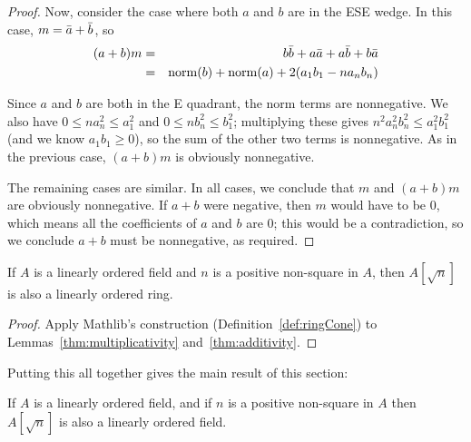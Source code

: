 \begin{proof}
  Now, consider the case where both $a$ and $b$ are in the ESE wedge. In this
  case, $m = \bar{a} + \bar{b}$, so
  \begin{eqnarray*}
    (a + b)m
      & = & b\bar{b} + a\bar{a} + a\bar{b} + b\bar{a} \\
      & = & \operatorname{norm}(b) + \operatorname{norm}(a) + 2(a_1b_1 - na_nb_n) \\
  \end{eqnarray*}

  Since $a$ and $b$ are both in the E quadrant, the norm terms are nonnegative.
  We also have $0 \leq na_n^2 \leq a_1^2$ and $0 \leq nb_n^2 \leq b_1^2$;
  multiplying these gives $n^2a_n^2b_n^2 \leq a_1^2b_1^2$ (and we know $a_1b_1
  \geq 0$), so the sum of the other two terms is nonnegative. As in the
  previous case, $(a + b)m$ is obviously nonnegative.

  The remaining cases are similar. In all cases, we conclude that $m$ and $(a +
  b)m$ are obviously nonnegative. If $a + b$ were negative, then $m$ would have
  to be 0, which means all the coefficients of $a$ and $b$ are 0; this would be
  a contradiction, so we conclude $a + b$ must be nonnegative, as required.
\end{proof}

\begin{corollary}
  \label{thm:adjoinOrderedRing}
  \leanok
  If $A$ is a linearly ordered field and $n$ is a positive non-square in $A$, then
  $A[\sqrt{n}]$ is also a linearly ordered ring.
\end{corollary}
\begin{proof}
  \leanok
  Apply Mathlib's construction (Definition~\ref{def:ringCone}) to
  Lemmas~\ref{thm:multiplicativity} and~\ref{thm:additivity}.
\end{proof}


Putting this all together gives the main result of this section:

\begin{theorem}
  \label{thm:adjoinOrderedField}
  \leanok

  If $A$ is a linearly ordered field, and if $n$ is a positive non-square in $A$
  then $A[\sqrt{n}]$ is also a linearly ordered field.
\end{theorem}

